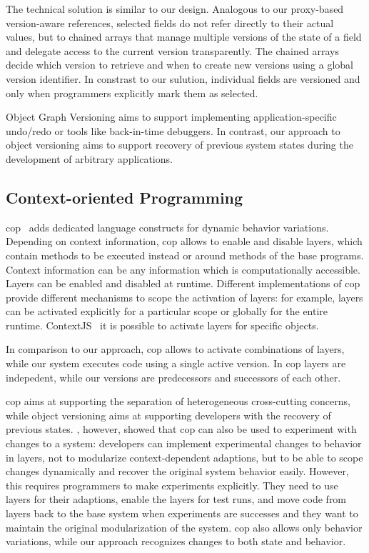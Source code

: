 The technical solution is similar to our design.
Analogous to our proxy-based version-aware references, selected fields do not refer directly to their actual values, but to chained arrays that manage multiple versions of the state of a field and delegate access to the current version transparently.
The chained arrays decide which version to retrieve and when to create new versions using a global version identifier.
In constrast to our sulution, individual fields are versioned and only when programmers explicitly mark them as selected.

Object Graph Versioning aims to support implementing application-specific undo/redo or tools like back-in-time debuggers.
In contrast, our approach to object versioning aims to support recovery of previous system states during the development of arbitrary applications.


\subsection{Context-oriented Programming}

\ac{cop}~\cite{Hirschfeld2008COP} adds dedicated language constructs for dynamic behavior variations.
Depending on context information, \ac{cop} allows to enable and disable layers, which contain methods to be executed instead or around methods of the base programs.
Context information can be any information which is computationally accessible.
Layers can be enabled and disabled at runtime.
Different implementations of \ac{cop} provide different mechanisms to scope the activation of layers: for example, layers can be activated explicitly for a particular scope or globally for the entire runtime.
ContextJS~\cite{Lincke2011OIC} it is possible to activate layers for specific objects.

In comparison to our approach, \ac{cop} allows to activate combinations of layers, while our system executes code using a single active version.
In \ac{cop} layers are indepedent, while our versions are predecessors and successors of each other.

\ac{cop} aims at supporting the separation of heterogeneous cross-cutting concerns, while object versioning aims at supporting developers with the recovery of previous states.
\cite{Lincke2012SCS}, however, showed that \ac{cop} can also be used to experiment with changes to a system: developers can implement experimental changes to behavior in layers, not to modularize context-dependent adaptions, but to be able to scope changes dynamically and recover the original system behavior easily.
However, this requires programmers to make experiments explicitly.
They need to use layers for their adaptions, enable the layers for test runs, and move code from layers back to the base system when experiments are successes and they want to maintain the original modularization of the system.
\ac{cop} also allows only behavior variations, while our approach recognizes changes to both state and behavior.


